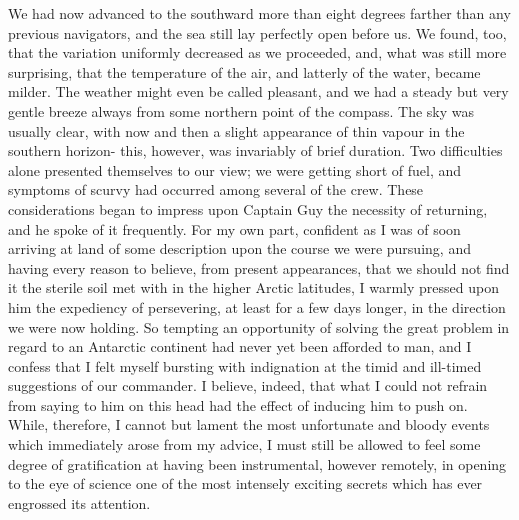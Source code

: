 We had now advanced to the southward more than eight degrees farther than any
previous navigators, and the sea still lay perfectly open before us. We found,
too, that the variation uniformly decreased as we proceeded, and, what was still
more surprising, that the temperature of the air, and latterly of the water,
became milder. The weather might even be called pleasant, and we had a steady
but very gentle breeze always from some northern point of the compass. The sky
was usually clear, with now and then a slight appearance of thin vapour in the
southern horizon- this, however, was invariably of brief duration. Two
difficulties alone presented themselves to our view; we were getting short of
fuel, and symptoms of scurvy had occurred among several of the crew. These
considerations began to impress upon Captain Guy the necessity of returning, and
he spoke of it frequently. For my own part, confident as I was of soon arriving
at land of some description upon the course we were pursuing, and having every
reason to believe, from present appearances, that we should not find it the
sterile soil met with in the higher Arctic latitudes, I warmly pressed upon him
the expediency of persevering, at least for a few days longer, in the direction
we were now holding. So tempting an opportunity of solving the great problem in
regard to an Antarctic continent had never yet been afforded to man, and I
confess that I felt myself bursting with indignation at the timid and ill-timed
suggestions of our commander. I believe, indeed, that what I could not refrain
from saying to him on this head had the effect of inducing him to push on.
While, therefore, I cannot but lament the most unfortunate and bloody events
which immediately arose from my advice, I must still be allowed to feel some
degree of gratification at having been instrumental, however remotely, in
opening to the eye of science one of the most intensely exciting secrets which
has ever engrossed its attention. 

